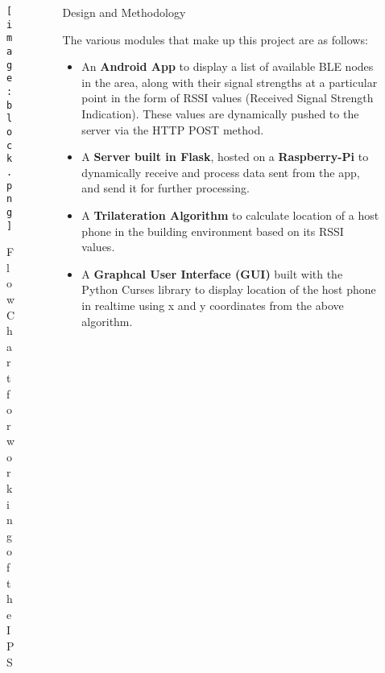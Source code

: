 \documentclass[final]{beamer}
\newlength{\sepwid}
\newlength{\onecolwid}
\newlength{\twocolwid}
\begin{document}
\begin{frame}[t]
\begin{columns}[t]
\begin{column}{\onecolwid}

\begin{figure}
\texttt{[image: block.png]}
\caption{Flow Chart for working of the IPS}
\end{figure}


\end{column} %

\begin{column}{\sepwid}\end{column} %

\begin{column}{\twocolwid} %

\begin{columns}[t,totalwidth=\twocolwid] %

\begin{column}{\onecolwid}\vspace{-.6in} %


\begin{block}{Design and Methodology}

The various modules that make up this project are as follows: 

\begin{itemize}
\item An \textbf {Android App} to display a list of available BLE nodes in the area, along with their signal strengths at a particular point in the form of RSSI values (Received Signal Strength Indication). These values are dynamically pushed to the server via the HTTP POST method.
\item A \textbf {Server built in Flask}, hosted on a \textbf{Raspberry-Pi} to dynamically receive and process data sent from the app, and send it for further processing. 
\item A \textbf {Trilateration Algorithm} to calculate location of a host phone in the building environment based on its RSSI values.
\item A \textbf {Graphcal User Interface (GUI)} built with the Python Curses library to display location of the host phone in realtime using x and y coordinates from the above algorithm.
\end{itemize}


\end{block}
\end{column}
\end{columns}
\end{column}
\end{columns}
\end{frame}
\end{document}
